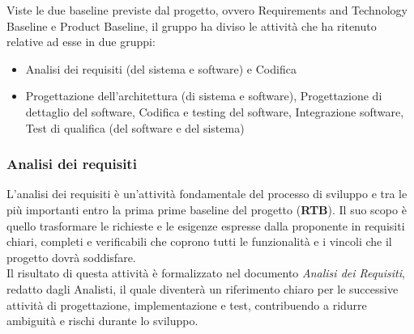 \documentclass[a4paper,12pt]{article}
\begin{document}
            Viste le due baseline previste dal progetto, ovvero Requirements and Technology Baseline e Product Baseline, il gruppo ha diviso le attività che ha ritenuto relative ad esse in due gruppi:
            \begin{itemize}
                \item[\textbf{RTB}] Analisi dei requisiti (del sistema e software) e Codifica
                \item[\textbf{PB}] Progettazione dell'architettura (di sistema e software), Progettazione di dettaglio del software, Codifica e testing del software, Integrazione software, Test di qualifica (del software e del sistema)
            \end{itemize}

        \subsubsection{Analisi dei requisiti}
            L'analisi dei requisiti è un'attività fondamentale del processo di sviluppo e tra le più importanti entro la prima prime baseline del progetto (\textbf{RTB}).
            Il suo scopo è quello trasformare le richieste e le esigenze espresse dalla proponente in requisiti chiari, completi e verificabili che coprono tutti le funzionalità e i vincoli che il progetto dovrà soddisfare.\\
            Il risultato di questa attività è formalizzato nel documento \textit{Analisi dei Requisiti}, redatto dagli Analisti, il quale diventerà un riferimento chiaro per le successive attività di progettazione, implementazione e test, contribuendo a ridurre ambiguità e rischi durante lo sviluppo.
\end{document}
